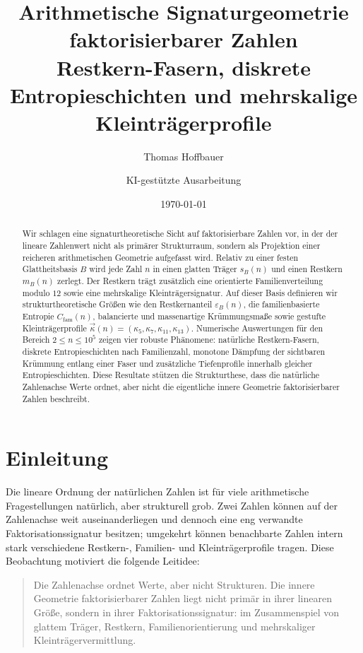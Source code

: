 \documentclass[11pt,a4paper]{article}
\title{Arithmetische Signaturgeometrie faktorisierbarer Zahlen\\
\large Restkern-Fasern, diskrete Entropieschichten und mehrskalige Kleinträgerprofile}
\author{Thomas Hoffbauer \and KI-gestützte Ausarbeitung}
\date{\today}
\theoremstyle{definition}
\theoremstyle{remark}
\begin{document}
\maketitle

\begin{abstract}
Wir schlagen eine signaturtheoretische Sicht auf faktorisierbare Zahlen vor, in der der lineare Zahlenwert nicht als primärer Strukturraum, sondern als Projektion einer reicheren arithmetischen Geometrie aufgefasst wird. Relativ zu einer festen Glattheitsbasis $B$ wird jede Zahl $n$ in einen glatten Träger $s_B(n)$ und einen Restkern $m_B(n)$ zerlegt. Der Restkern trägt zusätzlich eine orientierte Familienverteilung modulo $12$ sowie eine mehrskalige Kleinträgersignatur. Auf dieser Basis definieren wir strukturtheoretische Größen wie den Restkernanteil $\varepsilon_B(n)$, die familienbasierte Entropie $C_{\mathrm{fam}}(n)$, balancierte und massenartige Krümmungsmaße sowie gestufte Kleinträgerprofile $\vec\kappa(n)=(\kappa_5,\kappa_7,\kappa_{11},\kappa_{13})$. Numerische Auswertungen für den Bereich $2\le n\le 10^5$ zeigen vier robuste Phänomene: natürliche Restkern-Fasern, diskrete Entropieschichten nach Familienzahl, monotone Dämpfung der sichtbaren Krümmung entlang einer Faser und zusätzliche Tiefenprofile innerhalb gleicher Entropieschichten. Diese Resultate stützen die Strukturthese, dass die natürliche Zahlenachse Werte ordnet, aber nicht die eigentliche innere Geometrie faktorisierbarer Zahlen beschreibt.
\end{abstract}

\section{Einleitung}
Die lineare Ordnung der natürlichen Zahlen ist für viele arithmetische Fragestellungen natürlich, aber strukturell grob. Zwei Zahlen können auf der Zahlenachse weit auseinanderliegen und dennoch eine eng verwandte Faktorisationssignatur besitzen; umgekehrt können benachbarte Zahlen intern stark verschiedene Restkern-, Familien- und Kleinträgerprofile tragen. Diese Beobachtung motiviert die folgende Leitidee:

\begin{quote}
Die Zahlenachse ordnet Werte, aber nicht Strukturen. Die innere Geometrie faktorisierbarer Zahlen liegt nicht primär in ihrer linearen Größe, sondern in ihrer Faktorisationssignatur: im Zusammenspiel von glattem Träger, Restkern, Familienorientierung und mehrskaliger Kleinträgervermittlung.
\end{quote}
\end{document}
